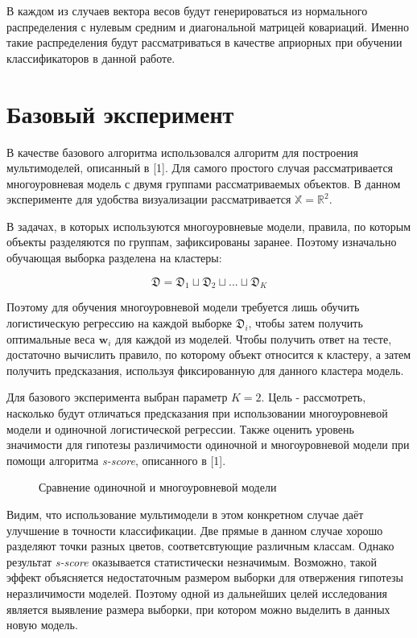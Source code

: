 \documentclass[12pt,twoside]{article}
\begin{document}
В каждом из случаев вектора весов будут генерироваться из нормального распределения с нулевым средним и диагональной матрицей ковариаций. Именно такие распределения будут рассматриваться в качестве априорных при обучении классификаторов в данной работе. 

\section{Базовый эксперимент}

В качестве базового алгоритма использовался алгоритм для построения мультимоделей, описанный в [1]. Для самого простого случая рассматривается многоуровневая модель с двумя группами рассматриваемых объектов. В данном эксперименте для удобства визуализации рассматривается $\mathbb{X} = \mathbb{R}^2$. 

В задачах, в которых используются многоуровневые модели, правила, по которым объекты разделяются по группам, зафиксированы заранее. Поэтому изначально обучающая выборка разделена на кластеры:

$$ \mathfrak{D} = \mathfrak{D}_1 \sqcup \mathfrak{D}_2 \sqcup ... \sqcup \mathfrak{D}_K $$

Поэтому для обучения многоуровневой модели требуется лишь обучить логистическую регрессию на каждой выборке $\mathfrak{D}_i$, чтобы затем получить оптимальные веса $\mathbf{w}_i$ для каждой из моделей. Чтобы получить ответ на тесте, достаточно вычислить правило, по которому объект относится к кластеру, а затем получить предсказания, используя фиксированную для данного кластера модель.

Для базового эксперимента выбран параметр  $K = 2$. Цель - рассмотреть, насколько будут отличаться предсказания при использовании многоуровневой модели и одиночной логистической регрессии. Также оценить уровень значимости для гипотезы различимости одиночной и многоуровневой модели при помощи алгоритма \emph{s-score}, описанного в [1].

\begin{figure}
        \caption{\label{fig:my-label} Сравнение одиночной и многоуровневой модели}
\end{figure}

Видим, что использование мультимодели в этом конкретном случае даёт улучшение в точности классификации. Две прямые в данном случае хорошо разделяют точки разных цветов, соответсвтующие различным классам. Однако результат \emph{s-score} оказывается статистически незначимым. Возможно, такой эффект объясняется недостаточным размером выборки для отвержения гипотезы неразличимости моделей. Поэтому одной из дальнейших целей исследования является выявление размера выборки, при котором можно выделить в данных новую модель.
\end{document}
